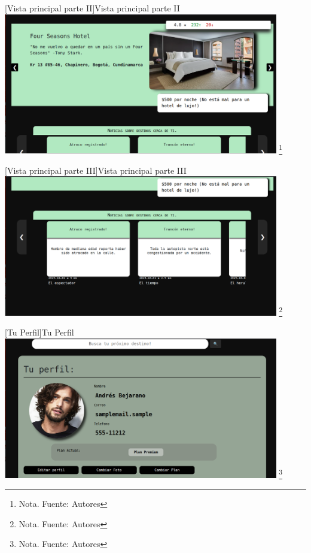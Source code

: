     \vspace{2mm}
    \begin{minipage}{0.9\textwidth}
    \centering
    [{Vista principal parte II}]{Vista principal parte II}
    \label{prot2}
    \includegraphics[width=0.9\textwidth]{Content/Images/VistaGeneral2.png}
    \footnote{Nota. \textup{Fuente: Autores}}
    \end{minipage}

    \vspace{2mm}
    \begin{minipage}{0.9\textwidth}
    \centering
    [{Vista principal parte III}]{Vista principal parte III}
    \label{prot3}
    \includegraphics[width=0.9\textwidth]{Content/Images/VistaGeneral3.png}
    \footnote{Nota. \textup{Fuente: Autores}}
    \end{minipage}

    \vspace{2mm}
    \begin{minipage}{0.9\textwidth}
    \centering
    [{Tu Perfil}]{Tu Perfil}
    \label{prot4}
    \includegraphics[width=0.9\textwidth]{Content/Images/TuPerfil.png}
    \footnote{Nota. \textup{Fuente: Autores}}
    \end{minipage}

